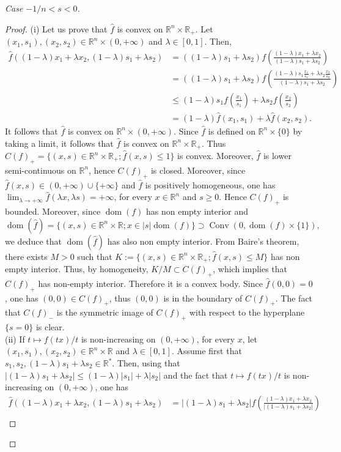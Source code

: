 \documentclass[10pt]{amsart}
\theoremstyle{definition}
\theoremstyle{remark}
\newcommand{\R}{\mathbb{R}}
\newcommand{\f}{\widehat{f}}
\newcommand{\conv}{\operatorname{Conv}}
\newcommand{\dom}{\operatorname{dom}}
\begin{document}
\begin{proof}[Case $-1/n<s< 0$]
\begin{proof}
(i) Let us prove that $\f$ is convex on $\R^n\times\R_+$.
Let $(x_1,s_1), (x_2,s_2)\in\R^n\times(0,+\infty)$ and $\lambda\in[0,1]$. Then, 
\begin{align*}
\f((1-\lambda)x_1+\lambda x_2,(1-\lambda)s_1+\lambda s_2) &=((1-\lambda)s_1+\lambda s_2) f\left(\frac{(1-\lambda)x_1+\lambda x_2}{(1-\lambda)s_1+\lambda s_2}\right) \\
&= ((1-\lambda)s_1+\lambda s_2) f\left(\frac{(1-\lambda)s_1\frac{x_1}{s_1}+\lambda s_2\frac{x_2}{s_2}}{(1-\lambda)s_1+\lambda s_2}\right)\\
&\le (1-\lambda)s_1f\left(\frac{x_1}{s_1}\right)+\lambda s_2f\left(\frac{x_2}{s_2}\right)\\
&= (1-\lambda)\f(x_1,s_1)+\lambda \f(x_2,s_2).
\end{align*}
It follows that $\f$ is convex on $\R^n\times(0,+\infty)$. Since $\f$ is defined on $\R^n\times\{0\}$ by taking a limit, it follows that $\f$ is convex on $\R^n\times\R_+$. Thus $C(f)_+=\{(x,s)\in\R^n\times\R_+; \f(x,s)\le1\}$ is convex. Moreover, $\f$ is lower semi-continuous on $\R^n$, hence $C(f)_+$ is closed. Moreover, since $\f(x,s)\in(0,+\infty)\cup\{+\infty\}$ and $\f$ is positively homogeneous, one has $\lim_{\lambda\to+\infty}\f(\lambda x,\lambda s)=+\infty$, for every $x\in\R^n$ and $s\ge0$. Hence $C(f)_+$ is bounded. Moreover, since $\dom(f)$ has non empty interior and 
\[
\dom(\f)=\{(x,s)\in\R^n\times\R; x\in |s|\dom(f)\}\supset \conv(0,\dom(f)\times\{1\}),
\]
we deduce that $\dom(\f)$ has also non empty interior. From Baire's theorem, there exists $M>0$ such that $K:=\{(x,s)\in\R^n\times\R_+; \f(x,s)\le M\}$ has non empty interior. Thus, by homogeneity, $K/M\subset C(f)_+$, which implies that $C(f)_+$ has non-empty interior. Therefore it is a convex body. Since $\f(0,0)=0$, one has $(0,0)\in C(f)_+$, thus $(0,0)$ is in the boundary of $C(f)_+$.  
The fact that $C(f)_{-}$ is the symmetric image of $C(f)_+$ with respect to the hyperplane $\{s=0\}$ is clear.\\
(ii) If $t\mapsto f(tx)/t$ is non-increasing on $(0,+\infty)$, for every $x$, let $(x_1,s_1), (x_2,s_2)\in\R^n\times\R$ and $\lambda\in[0,1]$. Assume first that $s_1, s_2, (1-\lambda)s_1+\lambda s_2\in\R^*$. 
Then, using that $|(1-\lambda)s_1+\lambda s_2|\le(1-\lambda)|s_1|+\lambda |s_2|$ and the fact that $t\mapsto f(tx)/t$ is non-increasing on $(0,+\infty)$, one has 
\begin{align*}
\f((1-\lambda)x_1+\lambda x_2,(1-\lambda)s_1+\lambda s_2) &=|(1-\lambda)s_1+\lambda s_2| f\left(\frac{(1-\lambda)x_1+\lambda x_2}{|(1-\lambda)s_1+\lambda s_2|}\right) \\

\end{align*}
\end{proof}
\end{proof}
\end{document}
